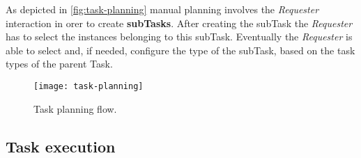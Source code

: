 As depicted in \autoref{fig:task-planning} manual planning involves the
\emph{Requester} interaction in orer to create \textbf{subTasks}. After creating
the subTask the \emph{Requester} has to select the instances belonging to this
subTask. Eventually the \emph{Requester} is able to select and, if needed,
configure the type of the subTask, based on the task types of the parent Task.
\begin{figure}[htb]
    \centering
    \texttt{[image: task-planning]}
    \caption{Task planning flow.}
    \label{fig:task-planning}
\end{figure}



\subsection{Task execution}




